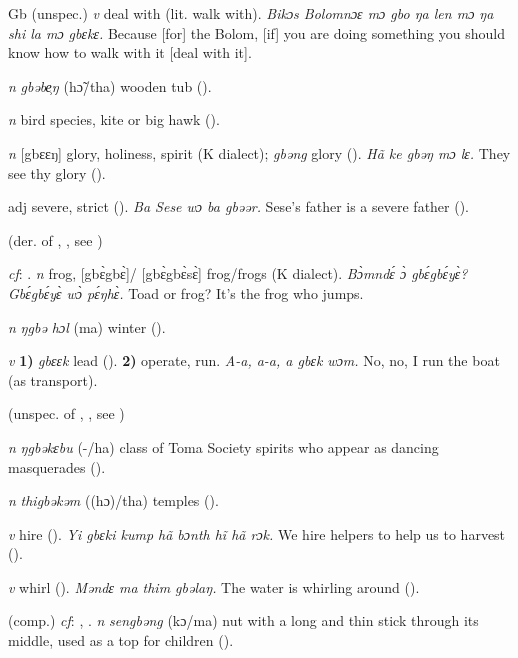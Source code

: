 \begin{letter}{Gb}
 (unspec.) \textit{v} deal with (lit. walk with). \textit{Bikɔs Bolomnɔɛ mɔ gbo ŋa len mɔ ŋa shi la mɔ gbɛkɛ.} Because [for] the Bolom, [if] you are doing something you should know how to walk with it [deal with it].

 \textit{n} \textit{gbəbe̹ŋ} (hɔ̃/tha) wooden tub (\citealt{Pichl1967}). 

 \textit{n} bird species, kite or big hawk (\citealt{Pichl1967}). 

 \textit{n} [gbɛɛŋ] glory, holiness, spirit (K dialect); \textit{gbəng} glory (\citealt{Pichl1967}). \textit{Hã ke gbəŋ mɔ lɛ.} They see thy glory (\citealt{Pichl1967}). 

 adj severe, strict (\citealt{Pichl1967}). \textit{Ba Sese wɔ ba gbəər.} Sese's father is a severe father (\citealt{Pichl1967}). 

 (der. of , , see ) 

 \textit{cf}: . \textit{n} frog, [gbɛ̀gbɛ̀]/ [gbɛ̀gbɛ̀sɛ̀] frog/frogs (K dialect). \textit{Bɔ̀mndɛ́ ɔ̀ gbɛ́gbɛ́yɛ̀? Gbɛ́gbɛ́yɛ̀ wɔ̀ pɛ́ŋhɛ̀.} Toad or frog? It's the frog who jumps.

 \textit{n} \textit{ŋgbə hɔl} (ma) winter (\citealt{Pichl1967}).

 \textit{v} \textbf{1)} \textit{gbɛɛk} lead (\citealt{Pichl1967}). \textbf{2)} operate, run. \textit{A-a, a-a, a gbɛk wɔm.} No, no, I run the boat (as transport).

 (unspec. of , , see ) 

 \textit{n} \textit{ŋgbəkɛbu} (-/ha) class of Toma Society spirits who appear as dancing masquerades (\citealt{Pichl1967}). 

 \textit{n} \textit{thigbəkəm} ((hɔ)/tha) temples (\citealt{Pichl1967}).

 \textit{v} hire (\citealt{Pichl1967}). \textit{Yi gbɛki kump hã bɔnth hĩ hã rɔk.} We hire helpers to help us to harvest (\citealt{Pichl1967}). 

 \textit{v} whirl (\citealt{Pichl1967}). \textit{Məndɛ ma thim gbəlaŋ.} The water is whirling around (\citealt{Pichl1967}). 

 (comp.) \textit{cf}: , . \textit{n} \textit{sengbəng} (kɔ/ma) nut with a long and thin stick through its middle, used as a top for children (\citealt{Pichl1967}). 


\end{letter}
